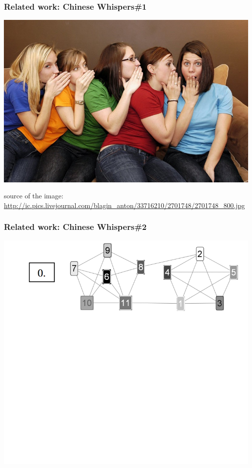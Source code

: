 \documentclass{beamer}
\begin{document}
\begin{frame}[fragile]
\frametitle{Related work: Chinese Whispers\#1}
\begin{center}
 \includegraphics[height=0.5\textwidth]{cw}
 
  {\tiny * source of the image: \url{http://ic.pics.livejournal.com/blagin_anton/33716210/2701748/2701748_800.jpg}}
 \end{center}
\end{frame}



\begin{frame}[fragile]
\frametitle{Related work: Chinese Whispers\#2}
\begin{center}
 \includegraphics[height=0.59\textwidth]{cw2-1}
 
 \end{center}
\end{frame}
\end{document}
